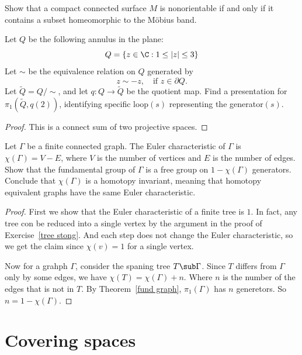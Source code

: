 \begin{exercise}
Show that a compact connected surface $M$ is nonorientable if and only if it contains a subset homeomorphic to the M\"obius band.
\end{exercise}
\begin{exercise}
Let $Q$ be the following annulus in the plane:
\[Q=\{z\in\C:1\leq|z|\leq 3\}\]
Let $\sim$ be the equivalence relation on $Q$ generated by
\[z\sim-z,\quad\text{if }z\in\partial Q.\]
Let $\widetilde{Q}=Q/\sim$, and let $q:Q\to\widetilde{Q}$ be the quotient map. Find a presentation for $\pi_1(\widetilde{Q},q(2))$, identifying specific loop$(s)$ representing the generator$(s)$.
\end{exercise}
\begin{proof}
This is a connect sum of two projective spaces.
\end{proof}
\begin{exercise}\label{Eular char graph}
Let $\Gamma$ be a finite connected graph. The Euler characteristic of $\Gamma$ is $\chi(\Gamma)=V-E$, where $V$ is the number of vertices and $E$ is the number of edges. Show that the fundamental group of $\Gamma$ is a free group on $1-\chi(\Gamma)$ generators. Conclude that $\chi(\Gamma)$ is a homotopy invariant, meaning that homotopy equivalent graphs have the same Euler characteristic.
\end{exercise}
\begin{proof}
First we show that the Euler characteristic of a finite tree is $1$. In fact, any tree con be reduced into a single vertex by the argument in the proof of Exercise~\ref{tree stong}. And each step does not change the Euler characteristic, so we get the claim since $\chi(v)=1$ for a single vertex.\par
Now for a grahph $\Gamma$, consider the spaning tree $T\sub\Gamma$. Since $T$ differs from $\Gamma$ only by some edges, we have $\chi(T)=\chi(\Gamma)+n$. Where $n$ is the number of the edges that is not in $T$. By Theorem~\ref{fund graph}, $\pi_1(\Gamma)$ has $n$ generetors. So $n=1-\chi(\Gamma)$. 
\end{proof}
\section{Covering spaces}
